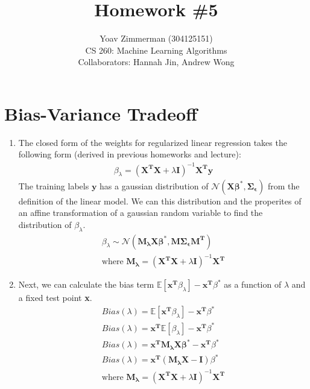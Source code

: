 \documentclass[12pt]{article}
\begin{document}
\title{Homework \#5}
\author{Yoav Zimmerman (304125151) \\
	    CS 260: Machine Learning Algorithms \\
	   Collaborators: Hannah Jin, Andrew Wong}
\maketitle

\section{Bias-Variance Tradeoff}
\begin{enumerate}[label=\alph*.]
	\item The closed form of the weights for regularized linear regression takes the following form (derived in previous homeworks and lecture): 
	\begin{gather*}
		\beta_\lambda = (\mathbf{X^T X} + \lambda \mathbf{I})^{-1}  \mathbf{X^T y}
	\end{gather*}
	The training labels $\mathbf{y}$ has a gaussian distribution of $\mathcal{N}( \mathbf{X \beta^*}, \mathbf{\Sigma_\epsilon})$ from the definition of the linear model. We can this distribution and the properites of an affine transformation of a gaussian random variable to find the distribution of $\beta_\lambda$. 
	\begin{gather*}
		\beta_\lambda \sim \mathcal{N}( \mathbf{M_\lambda X \beta^*}, \mathbf{M \Sigma_\epsilon M^T}) \\
		\text{where } \mathbf{M_\lambda} = (\mathbf{X^T X} + \lambda \mathbf{I})^{-1}  \mathbf{X^T}
	\end{gather*}
	
	\item Next, we can calculate the bias term $\mathbb{E}[\mathbf{x^T} \beta_\lambda] - \mathbf{x^T} \beta^*$ as a function of $\lambda$ and a fixed test point \textbf{x}.
	\begin{gather*}
		Bias(\lambda) = \mathbb{E}[\mathbf{x^T} \beta_\lambda] - \mathbf{x^T} \beta^* \\
		Bias(\lambda) = \mathbf{x^T} \mathbb{E}[\beta_\lambda] - \mathbf{x^T} \beta^* \\
		Bias(\lambda) = \mathbf{x^T}  \mathbf{M_\lambda X \beta^*} - \mathbf{x^T} \beta^* \\
		Bias(\lambda) = \mathbf{x^T} ( \mathbf{M_\lambda X} - \mathbf{I} ) \beta^* \\
		\text{where } \mathbf{M_\lambda } = (\mathbf{X^T X} + \lambda \mathbf{I})^{-1}  \mathbf{X^T}
	\end{gather*}
	

\end{enumerate}
\end{document}

